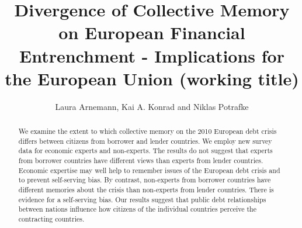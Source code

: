 \documentclass[12pt]{article}
\begin{document}
\title{Divergence of Collective Memory on European Financial Entrenchment -
Implications for the European Union (working title)}
\author{Laura Arnemann, Kai A. Konrad and Niklas Potrafke}
\maketitle

\begin{abstract}
We examine the extent to which collective memory on the 2010 European debt crisis differs between citizens from borrower and lender countries. We employ new survey data for economic experts and non-experts. The results do not suggest that experts from borrower countries have different views than experts from lender countries. Economic expertise may well help to remember issues of the European debt crisis and to prevent self-serving bias. By contrast, non-experts from borrower countries have different memories about the crisis than non-experts from lender countries. There is evidence for a self-serving bias. Our results suggest that public debt relationships between nations influence how citizens of the individual countries perceive the contracting countries.
\end{abstract}
\clearpage






%



\clearpage




\clearpage


\end{document}

